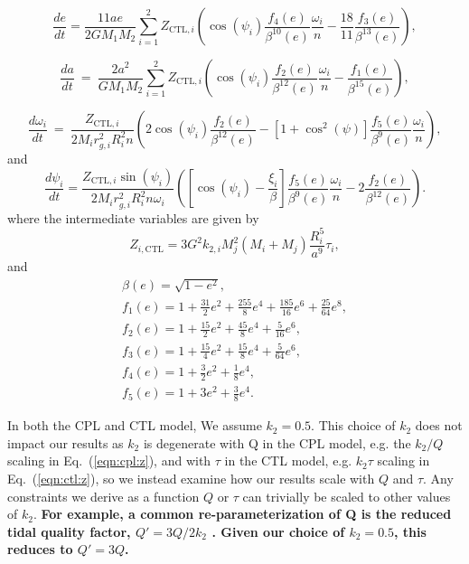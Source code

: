 \documentclass[twocolumn]{aastex61}
\newcommand{\xxx}[1]{{\textbf{#1}}}
\begin{document}
\begin{equation} \label{eqn:ctl:e}
  \frac{de}{dt} = \frac{11 ae}{2 G M_1 M_2}
  \sum_{i = 1}^2 Z_{\mathrm{CTL},i} \left( \cos(\psi_i) \frac{f_4(e)}{\beta^{10}(e)}  \frac{\omega_i}{n} -\frac{18}{11} \frac{f_3(e)}{\beta^{13}(e)}\right),
\end{equation}

\small
\begin{equation}\label{eqn:ctl:a}
  \frac{da}{dt} \ = \  \frac{2 a^2}{G M_1 M_2}
  \sum\limits_{i = 1}^2 Z_{\mathrm{CTL},i} \left( \cos(\psi_i) \frac{f_2(e)}{\beta^{12}(e)} \frac{\omega_i}{n} - \frac{f_1(e)}{\beta^{15}(e)}\right),
\end{equation}

\begin{equation}\label{eqn:ctl:omega}
  \frac{d\omega_i}{dt} \ = \ \frac{Z_{\mathrm{CTL},i}}{2 M_i r_{g,i}^2 
R_i^2 n} \left( 2 \cos(\psi_i) \frac{f_2(e)}{\beta^{12}(e)} - \left[ 1+\cos^2(\psi)
 \right] \frac{f_5(e)}{\beta^9(e)} 
\frac{\omega_i}{n} \right),  
\end{equation}
and
\begin{equation}\label{eqn:ctl:psi}
  \frac{d\psi_i}{dt} = \frac{Z_{\mathrm{CTL},i} \sin(\psi_i)}{2 M_i r_{g,i}^2 R_i^2 n \omega_i}\left( \left[ \cos(\psi_i) - \frac{\xi_i}{ \beta} \right] \frac{f_5(e)}{\beta^9(e)} \frac{\omega_i}{n} - 2 \frac{f_2(e)}{\beta^{12}(e)} \right).
\end{equation}
\normalsize
where the intermediate variables are given by 
\begin{equation}\label{eqn:ctl:z}
 Z_{i,\mathrm{CTL}} = 3 G^2 k_{2,i} M_j^2 (M_i+M_j) \frac{R_i^5}{a^9} \tau_i ,
\end{equation}
and 
\begin{equation}\label{eqn:ctl:f_e}
\begin{array}{l}
\beta(e) = \sqrt{1-e^2},\\
f_1(e) = 1 + \frac{31}{2} e^2 + \frac{255}{8} e^4 + \frac{185}{16} e^6 + \frac{25}{
64} e^8,\\
f_2(e) = 1 + \frac{15}{2} e^2 + \frac{45}{8} e^4 + \frac{5}{16} e^6,\\
f_3(e) = 1 + \frac{15}{4} e^2 + \frac{15}{8} e^4 + \frac{5}{64} e^6,\\
f_4(e) = 1 + \frac{3}{2} e^2 + \frac{1}{8} e^4,\\
f_5(e) = 1 + 3 e^2 + \frac{3}{8} e^4.
\end{array}
\end{equation}

In both the CPL and CTL model, We assume $k_2 = 0.5$. This choice of $k_2$ does not impact our results as $k_2$ is degenerate with Q in the CPL model, e.g. the $k_2/Q$ scaling in Eq.~(\ref{eqn:cpl:z}), and with $\tau$ in the CTL model, e.g. $k_2 \tau$ scaling in Eq.~(\ref{eqn:ctl:z}), so we instead examine how our results scale with $Q$ and $\tau$.  Any constraints we derive as a function $Q$ or $\tau$ can trivially be scaled to other values of $k_2$. \xxx{For example, a common re-parameterization of Q is the reduced tidal quality factor, $Q' = 3Q/2k_2$ \citep[e.g.][]{Leconte2010}. Given our choice of $k_2 = 0.5$, this reduces to $Q' = 3 Q$.}
\end{document}
